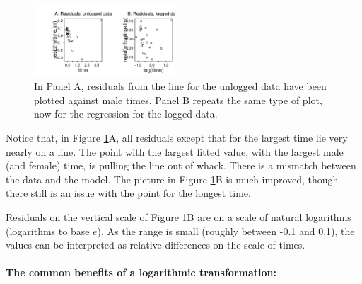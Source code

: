 \documentclass{tufte-book}\usepackage[]{graphicx}\usepackage[]{color}
\begin{document}
\begin{figure}
\begin{Schunk}


\centerline{\includegraphics[width=0.47\textwidth]{figs/11-tohoriz-mf-1} }

\end{Schunk}
\caption{In Panel A, residuals from the line for the unlogged data
  have been plotted against male times.  Panel B repeats the same
  type of plot, now for the regression for the logged data.\label{fig:to-horiz}}
\end{figure}

\noindent
Notice that, in Figure \ref{fig:to-horiz}A, all residuals except that
for the largest time lie very nearly on a line.  The point with the
largest fitted value, with the largest male (and female) time, is
pulling the line out of whack.  There is a mismatch between the data
and the model.  The picture in Figure \ref{fig:to-horiz}B is much
improved, though there still is an issue with the point for the
longest time.

Residuals on the vertical scale of Figure \ref{fig:to-horiz}B are on a
scale of natural logarithms (logarithms to base $e$).  As the range is
small (roughly between -0.1 and 0.1), the values can be interpreted as relative
differences on the scale of times.


\paragraph{The common benefits of a logarithmic transformation:}
\end{document}
